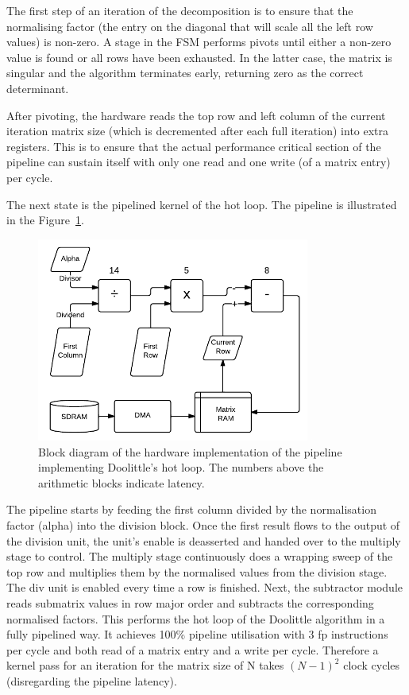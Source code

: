 \documentclass[]{article}
\begin{document}
The first step of an iteration of the decomposition is to ensure that the normalising factor (the entry on the diagonal that will scale all the left row values) is non-zero. A stage in the FSM performs pivots until either a non-zero value is found or all rows have been exhausted. In the latter case, the matrix is singular and the algorithm terminates early, returning zero as the correct determinant.

After pivoting, the hardware reads the top row and left column of the current iteration matrix size (which is decremented after each full iteration) into extra registers. This is to ensure that the actual performance critical section of the pipeline can sustain itself with only one read and one write (of a matrix entry) per cycle.

The next state is the pipelined kernel of the hot loop. The pipeline is illustrated in the Figure~\ref{fig:det_block}.

\begin{figure}[htbp]
	\begin{center}
		\includegraphics[width = 0.8\textwidth]{DeterminantPipeline.pdf}
	\end{center}
	\caption{Block diagram of the hardware implementation of the pipeline implementing Doolittle's hot loop. The numbers above the arithmetic blocks indicate latency.}
	\label{fig:det_block}
\end{figure}

The pipeline starts by feeding the first column divided by the normalisation factor (alpha) into the division block. Once the first result flows to the output of the division unit, the unit’s enable is deasserted and handed over to the multiply stage to control. The multiply stage continuously does a wrapping sweep of the top row and multiplies them by the normalised values from the division stage. The div unit is enabled every time a row is finished. Next, the subtractor module reads submatrix values in row major order and subtracts the corresponding normalised factors. This performs the hot loop of the Doolittle algorithm in a fully pipelined way. It achieves 100\% pipeline utilisation with 3 fp instructions per cycle and both read of a matrix entry and a write per cycle. Therefore a kernel pass for an iteration for the matrix size of N takes $(N-1)^2$ clock cycles (disregarding the pipeline latency).
\end{document}
